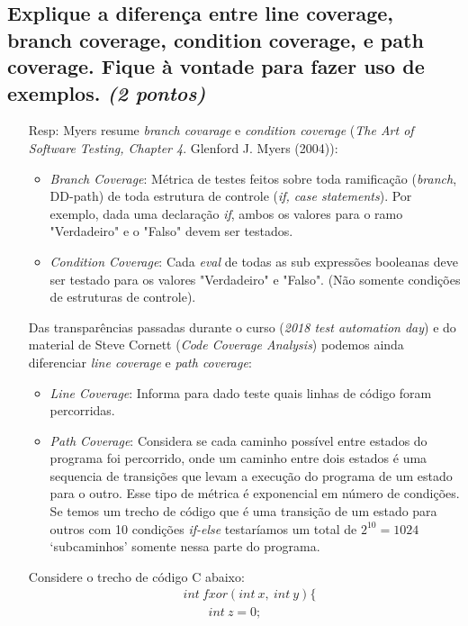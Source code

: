 \documentclass[paper=a4, fontsize=11pt]{scrartcl} %
\numberwithin{equation}{section} %
\numberwithin{figure}{section} %
\numberwithin{table}{section} %
\begin{document}
\subsection{Explique a diferença entre line coverage, branch coverage, condition coverage, e path coverage. Fique à vontade para fazer uso de exemplos. \textit{(2 pontos)}}
    \begin{itemize}
        \item[Resp:] Myers resume \textit{branch covarage} e \textit{condition coverage} (\textit{The Art of Software Testing, Chapter 4}. Glenford J. Myers (2004)):
        \begin{itemize}
            \item \textit{Branch Coverage}: Métrica de testes feitos sobre toda ramificação (\textit{branch}, DD-path) de toda estrutura de controle (\textit{if, case statements}). Por exemplo, dada uma declaração \textit{if}, ambos os valores para o ramo "Verdadeiro" e o "Falso" devem ser testados.
            \item \textit{Condition Coverage}: Cada \textit{eval} de todas as sub expressões booleanas deve ser testado para os valores "Verdadeiro" e "Falso". (Não somente condições de estruturas de controle).
        \end{itemize}
         Das transparências passadas durante o curso (\textit{2018 test automation day}) e do material de Steve Cornett (\textit{Code Coverage Analysis}) podemos ainda diferenciar \textit{line coverage} e \textit{path coverage}:
         \begin{itemize}
             \item \textit{Line Coverage}: Informa para dado teste quais linhas de código foram percorridas.
             \item \textit{Path Coverage}: Considera se cada caminho possível entre estados do programa foi percorrido, onde um caminho entre dois estados é uma sequencia de transições que levam a execução do programa de um estado para o outro. Esse tipo de métrica é exponencial em número de condições. Se temos um trecho de código que é uma transição de um estado para outros com 10 condições \textit{if-else} testaríamos um total de $2^{10} = 1024$ `subcaminhos' somente nessa parte do programa.
         \end{itemize}
         Considere o trecho de código C abaixo:
         \begin{align*}
             & int\ fxor(int\ x,\ int\ y)\{\\
             & \qquad int\ z=0;\\

\end{align*}
\end{itemize}
\end{document}
